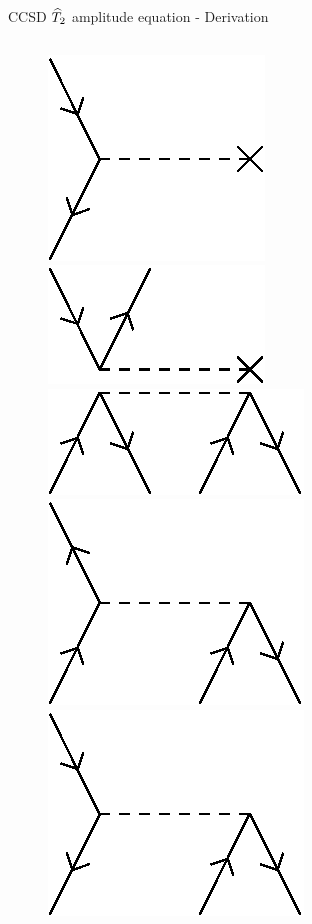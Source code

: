 \begin{frame}{CCSD $\widehat{T}_2$ amplitude equation - Derivation }
\begin{columns}[t]
\begin{figure}
        \parbox{0.20\textwidth}{
            \centering
            \includegraphics[scale=0.35]{graphics/f3}} 
        \parbox{0.20\textwidth}{
            \centering
            \includegraphics[scale=0.35]{graphics/f4}} 
        \parbox{0.20\textwidth}{
            \centering
            \includegraphics[scale=0.35]{graphics/v1}} 
        \parbox{0.20\textwidth}{
            \centering
            \includegraphics[scale=0.35]{graphics/v2}} 
        \parbox{0.20\textwidth}{
            \centering
            \includegraphics[scale=0.35]{graphics/v3}} 

\end{figure}
\end{columns}
\end{frame}
